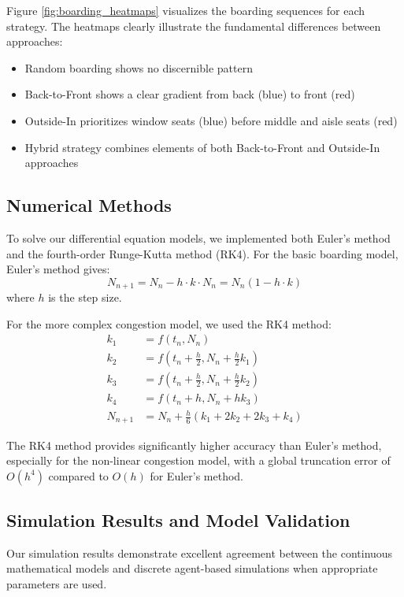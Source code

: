 \documentclass[12pt,a4paper]{article}
\begin{document}
Figure \ref{fig:boarding_heatmaps} visualizes the boarding sequences for each strategy. The heatmaps clearly illustrate the fundamental differences between approaches:
\begin{itemize}
    \item Random boarding shows no discernible pattern
    \item Back-to-Front shows a clear gradient from back (blue) to front (red)
    \item Outside-In prioritizes window seats (blue) before middle and aisle seats (red)
    \item Hybrid strategy combines elements of both Back-to-Front and Outside-In approaches
\end{itemize}

\subsection{Numerical Methods}
To solve our differential equation models, we implemented both Euler's method and the fourth-order Runge-Kutta method (RK4). For the basic boarding model, Euler's method gives:
\begin{equation}
N_{n+1} = N_n - h \cdot k \cdot N_n = N_n (1 - h \cdot k)
\label{eq:euler_boarding}
\end{equation}
where $h$ is the step size.

For the more complex congestion model, we used the RK4 method:
\begin{align}
k_1 &= f(t_n, N_n) \\
k_2 &= f(t_n + \frac{h}{2}, N_n + \frac{h}{2} k_1) \\
k_3 &= f(t_n + \frac{h}{2}, N_n + \frac{h}{2} k_2) \\
k_4 &= f(t_n + h, N_n + h k_3) \\
N_{n+1} &= N_n + \frac{h}{6}(k_1 + 2k_2 + 2k_3 + k_4)
\label{eq:rk4}
\end{align}

The RK4 method provides significantly higher accuracy than Euler's method, especially for the non-linear congestion model, with a global truncation error of $O(h^4)$ compared to $O(h)$ for Euler's method.

\subsection{Simulation Results and Model Validation}
Our simulation results demonstrate excellent agreement between the continuous mathematical models and discrete agent-based simulations when appropriate parameters are used.
\end{document}
